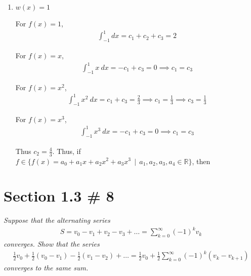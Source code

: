 \documentclass[12pt]{article}
\newcommand{\suchthat}{\, \mid \,}
\begin{document}
\begin{enumerate}[\ \ (a)\ \ ]

\item {\it $w(x) = 1$}

For $f(x) = 1$, 
\begin{align*}
\int_{-1}^{1}dx = c_1 + c_2 + c_3 = 2
\end{align*}

For $f(x) = x$, 
\begin{align*}
\int_{-1}^{1}x \ dx = -c_1 + c_3 = 0 \implies c_1 = c_3
\end{align*}

For $f(x) = x^2$, 
\begin{align*}
\int_{-1}^{1}x^2 \ dx = c_1 + c_3 = \frac{2}{3} \implies c_1 = \frac{1}{3} \implies c_3 = \frac{1}{3}
\end{align*}

For $f(x) = x^3$, 
\begin{align*}
\int_{-1}^{1}x^3 \ dx = -c_1 + c_3 = 0 \implies c_1 = c_3
\end{align*}

Thus $c_2 = \frac{4}{3}$.  Thus, if $f \in \{f(x) = a_0 + a_1x + a_2x^2 + a_3x^3 \suchthat a_1, a_2, a_3, a_4 \in \mathbb R \}$, then 

\end{enumerate}

\pagebreak
\section*{Section 1.3 \# 8}

{\it Suppose that the alternating series}
\begin{align*}
S = v_0 - v_1 + v_2 - v_3 + \dots = \sum_{k=0}^\infty(-1)^kv_k
\end{align*}
{\it converges.  Show that the series}
\begin{align*}
\tfrac{1}{2}v_0 + \tfrac{1}{2}(v_0 - v_1) - \tfrac{1}{2}(v_1 - v_2) + \dots = \tfrac{1}{2}v_0 + \tfrac{1}{2}\sum_{k=0}^\infty(-1)^k(v_k - v_{k+1})
\end{align*}
{\it converges to the same sum.} \\
\end{document}
